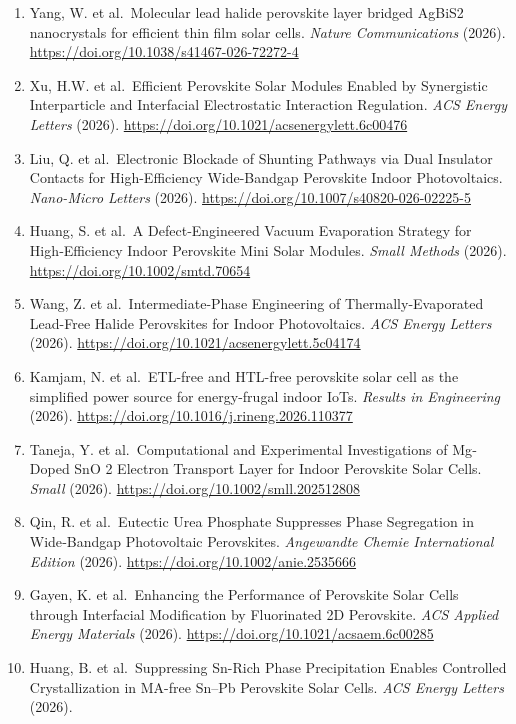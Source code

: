\documentclass[
  11pt,
]{article}
\begin{document}
\begin{enumerate}
\item
  Yang, W. et al.~Molecular lead halide perovskite layer bridged AgBiS2
  nanocrystals for efficient thin film solar cells. \emph{Nature
  Communications} (2026).
  \url{https://doi.org/10.1038/s41467-026-72272-4}
\item
  Xu, H.W. et al.~Efficient Perovskite Solar Modules Enabled by
  Synergistic Interparticle and Interfacial Electrostatic Interaction
  Regulation. \emph{ACS Energy Letters} (2026).
  \url{https://doi.org/10.1021/acsenergylett.6c00476}
\item
  Liu, Q. et al.~Electronic Blockade of Shunting Pathways via Dual
  Insulator Contacts for High-Efficiency Wide-Bandgap Perovskite Indoor
  Photovoltaics. \emph{Nano-Micro Letters} (2026).
  \url{https://doi.org/10.1007/s40820-026-02225-5}
\item
  Huang, S. et al.~A Defect‐Engineered Vacuum Evaporation Strategy for
  High‐Efficiency Indoor Perovskite Mini Solar Modules. \emph{Small
  Methods} (2026). \url{https://doi.org/10.1002/smtd.70654}
\item
  Wang, Z. et al.~Intermediate-Phase Engineering of Thermally-Evaporated
  Lead-Free Halide Perovskites for Indoor Photovoltaics. \emph{ACS
  Energy Letters} (2026).
  \url{https://doi.org/10.1021/acsenergylett.5c04174}
\item
  Kamjam, N. et al.~ETL-free and HTL-free perovskite solar cell as the
  simplified power source for energy-frugal indoor IoTs. \emph{Results
  in Engineering} (2026).
  \url{https://doi.org/10.1016/j.rineng.2026.110377}
\item
  Taneja, Y. et al.~Computational and Experimental Investigations of
  Mg‐Doped SnO 2 Electron Transport Layer for Indoor Perovskite Solar
  Cells. \emph{Small} (2026).
  \url{https://doi.org/10.1002/smll.202512808}
\item
  Qin, R. et al.~Eutectic Urea Phosphate Suppresses Phase Segregation in
  Wide‐Bandgap Photovoltaic Perovskites. \emph{Angewandte Chemie
  International Edition} (2026).
  \url{https://doi.org/10.1002/anie.2535666}
\item
  Gayen, K. et al.~Enhancing the Performance of Perovskite Solar Cells
  through Interfacial Modification by Fluorinated 2D Perovskite.
  \emph{ACS Applied Energy Materials} (2026).
  \url{https://doi.org/10.1021/acsaem.6c00285}
\item
  Huang, B. et al.~Suppressing Sn-Rich Phase Precipitation Enables
  Controlled Crystallization in MA-free Sn--Pb Perovskite Solar Cells.
  \emph{ACS Energy Letters} (2026).

\end{enumerate}
\end{document}
